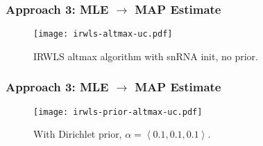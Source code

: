 \documentclass{beamer}
\newcommand{\importfig}[1]{{#1.tex}}
\begin{document}
\begin{frame}
    \frametitle{Approach 3: MLE $\to$ MAP Estimate}
    \begin{figure}[!htbp]
        \centering
        \texttt{[image: irwls-altmax-uc.pdf]}
        \caption{IRWLS altmax algorithm with snRNA init, no prior.}
    \end{figure}
\end{frame}

\begin{frame}
    \frametitle{Approach 3: MLE $\to$ MAP Estimate}
    \begin{figure}[!htbp]
        \centering
        \texttt{[image: irwls-prior-altmax-uc.pdf]}
        \caption{With Dirichlet prior, $\alpha = \left\langle 0.1, 0.1, 0.1 \right\rangle$.}
    \end{figure}
\end{frame}

\end{document}
